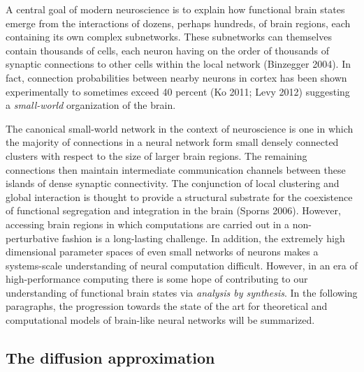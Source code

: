 \documentclass{ucetd}
\begin{document}
A central goal of modern neuroscience is to explain how functional brain states emerge from the interactions of dozens, perhaps hundreds, of brain regions, each containing its own complex subnetworks.  These subnetworks can themselves contain thousands of cells, each neuron having on the order of thousands of synaptic connections to other cells within the local network (Binzegger 2004). In fact, connection probabilities between nearby neurons in cortex has been shown experimentally to sometimes exceed 40 percent (Ko 2011; Levy 2012) suggesting a \emph{small-world} organization of the brain. 

The canonical small-world network in the context of neuroscience is one in which the majority of connections in a neural network form small densely connected clusters with respect to the size of larger brain regions.  The remaining connections then maintain intermediate communication channels between these islands of dense synaptic connectivity. The conjunction of local clustering and global interaction is thought to provide a structural substrate for the coexistence of functional segregation and integration in the brain (Sporns 2006). However, accessing brain regions in which computations are carried out in a non-perturbative fashion is a long-lasting challenge. In addition, the extremely high dimensional parameter spaces of even small networks of neurons makes a systems-scale understanding of neural computation difficult. However, in an era of high-performance computing there is some hope of contributing to our understanding of functional brain states via \emph{analysis by synthesis}. In the following paragraphs, the progression towards the state of the art for theoretical and computational models of brain-like neural networks will be summarized. 


\subsection{The diffusion approximation}
\end{document}
